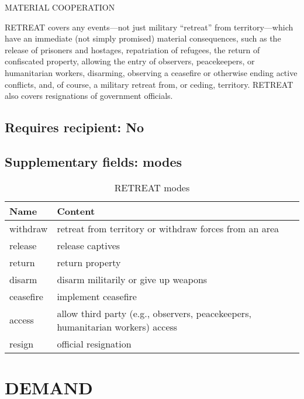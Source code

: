 \documentclass[11pt]{report}
\newcommand{\plcat}[1]{\textsf{#1}}
\begin{document}
\textsf{MATERIAL COOPERATION} \vspace{8pt}


\plcat{RETREAT} covers any events---not just military ``retreat'' from territory---which have an immediate (not simply promised) material consequences, such as the release of prisoners and hostages, repatriation of refugees, the return of  confiscated property, allowing the entry of observers, peacekeepers, or humanitarian workers, disarming, observing a ceasefire or otherwise ending active conflicts, and, of course, a military retreat from, or ceding, territory. \plcat{RETREAT} also covers resignations of government officials.

\subsection{Requires recipient: No}

\subsection{Supplementary fields: modes}

\begin{table}[htp]
\color{red}
\caption{RETREAT modes}
\begin{center}
\begin{tabular}{|l|p{13cm}|}
\hline
Name & Content \\
\hline
withdraw & retreat from territory or withdraw forces from an area\\
release & release captives \\
return & return property \\
disarm & disarm militarily or give up weapons\\ 
ceasefire & implement ceasefire\\
access & allow third party (e.g., observers, peacekeepers, humanitarian workers) access \\
resign & official resignation \\
\hline
\end{tabular}
\end{center}
\label{tab:retreatmode}
\end{table}%




\newpage  

\section{DEMAND}
\end{document}
